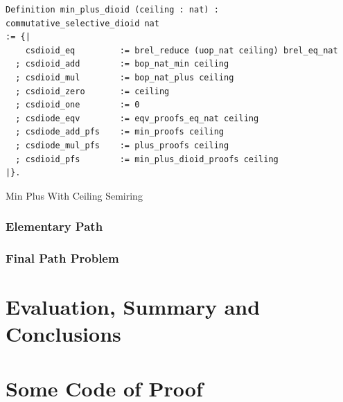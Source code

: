 \documentclass[a4paper,12pt,twoside,openright]{report}
\begin{document}
\begin{listing}[H]
\begin{verbatim}
Definition min_plus_dioid (ceiling : nat) : commutative_selective_dioid nat 
:= {|
    csdioid_eq         := brel_reduce (uop_nat ceiling) brel_eq_nat
  ; csdioid_add        := bop_nat_min ceiling
  ; csdioid_mul        := bop_nat_plus ceiling                                  
  ; csdioid_zero       := ceiling
  ; csdioid_one        := 0
  ; csdiode_eqv        := eqv_proofs_eq_nat ceiling
  ; csdiode_add_pfs    := min_proofs ceiling 
  ; csdiode_mul_pfs    := plus_proofs ceiling                                      
  ; csdioid_pfs        := min_plus_dioid_proofs ceiling 
|}.
\end{verbatim}
\caption{Min Plus With Ceiling Semiring} 
\label{coq:def:min_plus_dioid}
\end{listing}

\subsection{Elementary Path}
\subsection{Final Path Problem}

\chapter{Evaluation, Summary and Conclusions} 


%



\appendix
\chapter{Some Code of Proof}
\singlespacing


 

\end{document}
